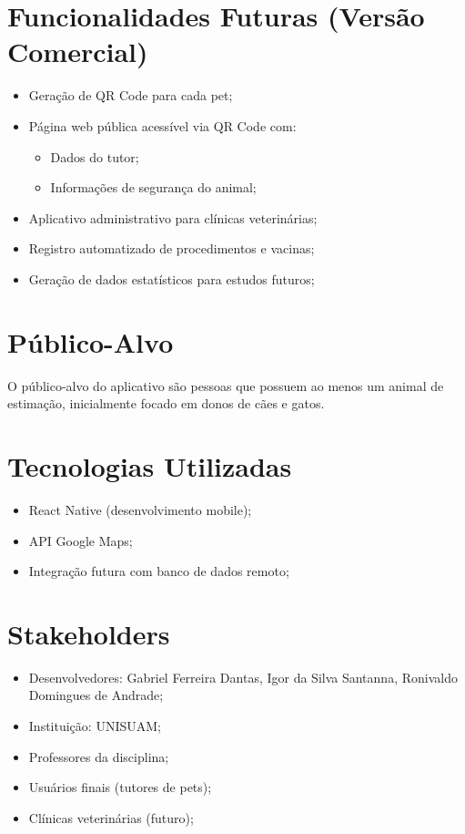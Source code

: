\documentclass[12pt,a4paper]{article}
\begin{document}
\section{Funcionalidades Futuras (Versão Comercial)}
\begin{itemize}
    \item Geração de QR Code para cada pet;
    \item Página web pública acessível via QR Code com:
    \begin{itemize}
        \item Dados do tutor;
        \item Informações de segurança do animal;
    \end{itemize}
    \item Aplicativo administrativo para clínicas veterinárias;
    \item Registro automatizado de procedimentos e vacinas;
    \item Geração de dados estatísticos para estudos futuros;
\end{itemize}

\section{Público-Alvo}
O público-alvo do aplicativo são pessoas que possuem ao menos um animal de estimação, inicialmente focado em donos de cães e gatos.

\section{Tecnologias Utilizadas}
\begin{itemize}
    \item React Native (desenvolvimento mobile);
    \item API Google Maps;
    \item Integração futura com banco de dados remoto;
\end{itemize}

\section{Stakeholders}
\begin{itemize}
    \item Desenvolvedores: Gabriel Ferreira Dantas, Igor da Silva Sant\textquotesingle anna, Ronivaldo Domingues de Andrade;
    \item Instituição: UNISUAM;
    \item Professores da disciplina;
    \item Usuários finais (tutores de pets);
    \item Clínicas veterinárias (futuro);
\end{itemize}
\end{document}

